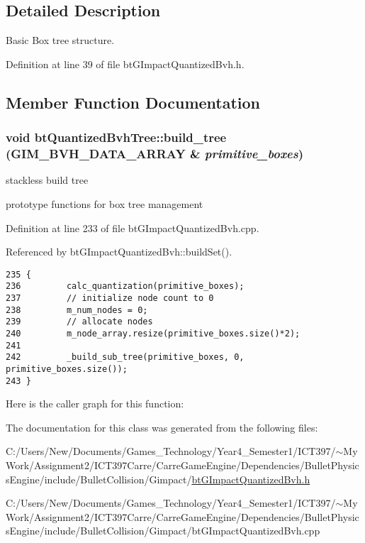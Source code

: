\subsection{Detailed Description}
Basic Box tree structure. 

Definition at line 39 of file btGImpactQuantizedBvh.h.

\subsection{Member Function Documentation}
\hypertarget{classbt_quantized_bvh_tree_a2229fd3e3e2004cdf8151437535e936}{
\subsubsection[build\_\-tree]{\setlength{\rightskip}{0pt plus 5cm}void btQuantizedBvhTree::build\_\-tree (GIM\_\-BVH\_\-DATA\_\-ARRAY \& {\em primitive\_\-boxes})}}
\label{classbt_quantized_bvh_tree_a2229fd3e3e2004cdf8151437535e936}


stackless build tree 

prototype functions for box tree management 

Definition at line 233 of file btGImpactQuantizedBvh.cpp.

Referenced by btGImpactQuantizedBvh::buildSet().

\begin{Code}\begin{verbatim}235 {
236         calc_quantization(primitive_boxes);
237         // initialize node count to 0
238         m_num_nodes = 0;
239         // allocate nodes
240         m_node_array.resize(primitive_boxes.size()*2);
241 
242         _build_sub_tree(primitive_boxes, 0, primitive_boxes.size());
243 }
\end{verbatim}
\end{Code}




Here is the caller graph for this function:

The documentation for this class was generated from the following files:\begin{CompactItemize}
\item 
C:/Users/New/Documents/Games\_\-Technology/Year4\_\-Semester1/ICT397/$\sim$My Work/Assignment2/ICT397Carre/CarreGameEngine/Dependencies/BulletPhysicsEngine/include/BulletCollision/Gimpact/\hyperlink{bt_g_impact_quantized_bvh_8h}{btGImpactQuantizedBvh.h}\item 
C:/Users/New/Documents/Games\_\-Technology/Year4\_\-Semester1/ICT397/$\sim$My Work/Assignment2/ICT397Carre/CarreGameEngine/Dependencies/BulletPhysicsEngine/include/BulletCollision/Gimpact/btGImpactQuantizedBvh.cpp\end{CompactItemize}

